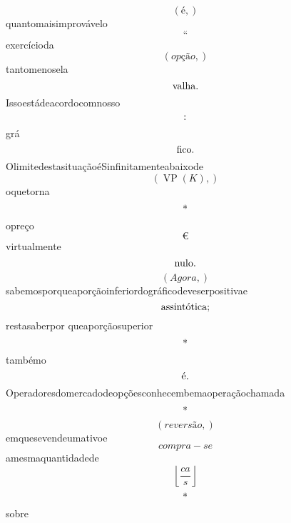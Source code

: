 \documentclass{article}
\begin{document}
\begin{equation}
\left( é,\right)
\end{equation}quantomaisimprovávelo\begin{equation}
“
\end{equation}exercícioda\begin{equation}
\left( opção,\right)
\end{equation}tantomenosela\begin{equation}
$valha.$
\end{equation}Issoestádeacordocomnosso\begin{equation}
$:$
\end{equation}grá\begin{equation}
$fico.$
\end{equation}OlimitedestasituaçãoéSinfinitamenteabaixode\begin{equation}
\left( \operatorname{VP}{\left(K \right)},\right)
\end{equation}oquetorna\begin{equation}
$*$
\end{equation}opreço\begin{equation}
€
\end{equation}virtualmente\begin{equation}
$nulo.$
\end{equation}\begin{equation}
\left( Agora,\right)
\end{equation}sabemosporqueaporçãoinferiordográficodeveserpositivae\begin{equation}
$assintótica;$
\end{equation}restasaberpor queaporçãosuperior\begin{equation}
$*$
\end{equation}tambémo\begin{equation}
$é.$
\end{equation}Operadoresdomercadodeopçõesconhecembemaoperaçãochamada\begin{equation}
$*$
\end{equation}\begin{equation}
\left( reversão,\right)
\end{equation}emquesevendeumativoe\begin{equation}
compra - se
\end{equation}amesmaquantidadede\begin{equation}
\left\lfloor{\frac{ca}{s}}\right\rfloor
\end{equation}\begin{equation}
$*$
\end{equation}sobre\begin{equation}

\end{equation}
\end{document}
